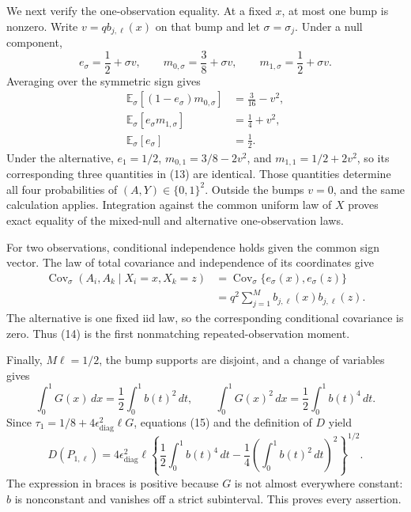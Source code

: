 We next verify the one-observation equality. At a fixed \(x\), at most one bump is nonzero. Write \(v=qb_{j,\ell}(x)\) on that bump and let \(\sigma=\sigma_j\). Under a null component,
\[
 e_\sigma=\frac12+\sigma v,
 \qquad m_{0,\sigma}=\frac38+\sigma v,
 \qquad m_{1,\sigma}=\frac12+\sigma v.
\]
Averaging over the symmetric sign gives
\[
 \begin{aligned}
 \mathbb E_\sigma[(1-e_\sigma)m_{0,\sigma}]&=\frac3{16}-v^2,\\
 \mathbb E_\sigma[e_\sigma m_{1,\sigma}]&=\frac14+v^2,\\
 \mathbb E_\sigma[e_\sigma]&=\frac12.
 \end{aligned}                                                       \tag{13}
\]
Under the alternative, \(e_1=1/2\), \(m_{0,1}=3/8-2v^2\), and \(m_{1,1}=1/2+2v^2\), so its corresponding three quantities in (13) are identical. Those quantities determine all four probabilities of \((A,Y)\in\{0,1\}^2\). Outside the bumps \(v=0\), and the same calculation applies. Integration against the common uniform law of \(X\) proves exact equality of the mixed-null and alternative one-observation laws.

For two observations, conditional independence holds given the common sign vector. The law of total covariance and independence of its coordinates give
\[
 \begin{aligned}
 \operatorname{Cov}_{\sigma}(A_i,A_k\mid X_i=x,X_k=z)
 &=\operatorname{Cov}_{\sigma}\{e_\sigma(x),e_\sigma(z)\}\\
 &=q^2\sum_{j=1}^M b_{j,\ell}(x)b_{j,\ell}(z).
 \end{aligned}                                                       \tag{14}
\]
The alternative is one fixed iid law, so the corresponding conditional covariance is zero. Thus (14) is the first nonmatching repeated-observation moment.

Finally, \(M\ell=1/2\), the bump supports are disjoint, and a change of variables gives
\[
 \int_0^1G(x)\,dx=\frac12\int_0^1b(t)^2\,dt,
 \qquad
 \int_0^1G(x)^2\,dx=\frac12\int_0^1b(t)^4\,dt.                       \tag{15}
\]
Since \(\tau_1=1/8+4\epsilon_{\mathrm{diag}}^2\ell G\), equations (15) and the definition of \(D\) yield
\[
 D(P_{1,\ell})
 =4\epsilon_{\mathrm{diag}}^2\ell
 \left\{\frac12\int_0^1b(t)^4\,dt
 -\frac14\left(\int_0^1b(t)^2\,dt\right)^2\right\}^{1/2}.            \tag{16}
\]
The expression in braces is positive because \(G\) is not almost everywhere constant: \(b\) is nonconstant and vanishes off a strict subinterval. This proves every assertion.

